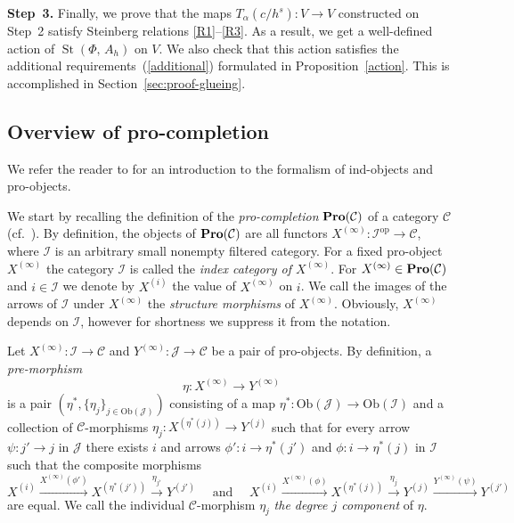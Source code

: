 \documentclass[oneside, 11pt]{amsart}
\numberwithin{equation}{section}
\newcommand{\St}{\mathop{\mathrm{St}}\nolimits}
\theoremstyle{definition}
\theoremstyle{definition}
\theoremstyle{remark}
\newcommand{\catname}[1]{{\normalfont\textbf{#1}}} %
\begin{document}
{\bf Step~3.} Finally, we prove that the maps $T_\alpha(c/h^s)\colon V\rightarrow V$ constructed on Step~2 satisfy Steinberg relations \eqref{R1}--\eqref{R3}.
As a result, we get a well-defined action of $\St(\Phi,\,A_h)$ on $V$. We also check that this action satisfies the additional requirements~(\ref{additional}) formulated in Proposition~\ref{action}. This is accomplished in Section~\ref{sec:proof-glueing}.






























\subsection{Overview of pro-completion}
\label{pro-completion}
We refer the reader to \cite[Section~6.1]{SK06} for an introduction to the formalism of ind-objects and pro-objects.

We start by recalling the definition of the {\it pro-completion} $\catname{Pro}(\mathcal{C})$ of a category $\mathcal{C}$ (cf.~\cite[\S~2.1]{LSV20}). By definition, the objects of $\catname{Pro}(\mathcal{C})$ are all functors $X^{(\infty)}\colon\mathcal{I}^{\mathrm{op}} \to \mathcal{C}$, where $\mathcal{I}$ is an arbitrary small nonempty filtered category. For a fixed pro-object $X^{(\infty)}$ the category $\mathcal{I}$ is called the {\it index category of $X^{(\infty)}$}. For $X^{(\infty)} \in
\catname{Pro}(\mathcal{C})$ and $i \in \mathcal{I}$ we denote by $X^{(i)}$ the value of $X^{(\infty)}$ on $i$. 
We call the images of the arrows of $\mathcal{I}$ under $X^{(\infty)}$ the {\it structure morphisms} of $X^{(\infty)}$. Obviously, $X^{(\infty)}$ depends on $\mathcal I$, however for shortness we suppress it from the notation.

Let $X^{(\infty)}\colon\mathcal{I}\to\mathcal{C}$ and $Y^{(\infty)}\colon\mathcal{J}\to\mathcal{C}$ be a pair of pro-objects.
By definition, a {\it pre-morphism} $$\eta\colon X^{(\infty)} \to Y^{(\infty)}$$ is a pair $\left(\eta^*, \{\eta_j\}_{j\in\mathrm{Ob}(\mathcal{J})}\right)$ consisting of a map $\eta^*\colon \mathrm{Ob}(\mathcal{J})\to\mathrm{Ob}(\mathcal{I})$ and a collection of $\mathcal{C}$-morphisms $\eta_j\colon X^{(\eta^*(j))}\to Y^{(j)}$ such that for every arrow $\psi\colon j' \to j$ in $\mathcal J$ there exists $i$ and arrows $\phi'\colon i\rightarrow\eta^*(j')$ and $\phi\colon i\rightarrow\eta^*(j)$ in $\mathcal I$ such that the composite morphisms $$X^{(i)} \xrightarrow{X^{(\infty)}(\phi')} X^{(\eta^*(j'))} \xrightarrow{\eta_{j'}} Y^{(j')} \quad\text{ and }\quad X^{(i)} \xrightarrow{X^{(\infty)}(\phi)} X^{(\eta^*(j))} \xrightarrow{\eta_j} Y^{(j)} \xrightarrow{Y^{(\infty)}(\psi)} Y^{(j')}$$ are equal. We call the individual $\mathcal{C}$-morphism $\eta_j$ {\it the degree $j$ component} of $\eta$.
\end{document}
